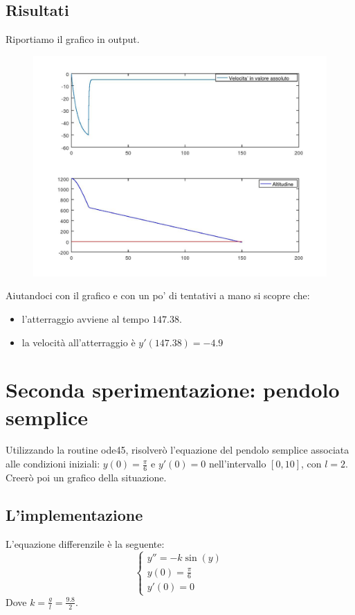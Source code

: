 \documentclass{article}
\begin{document}
	\subsection{Risultati}
	Riportiamo il grafico in output.\\
	\begin{figure}[htp!]
		\centering 
		\includegraphics[width=\textwidth]{5_1.jpeg}
	\end{figure}
	\newpage
	Aiutandoci con il grafico e con un po' di tentativi a mano si scopre che:\\
	\begin{itemize}
		\item l'atterraggio avviene al tempo $147.38$.
		\item la velocità all'atterraggio è $y'(147.38)=-4.9$
	\end{itemize}

	\section{Seconda sperimentazione: pendolo semplice}
	Utilizzando la routine ode45, risolverò l’equazione del pendolo semplice associata alle	condizioni iniziali: $y(0)=\frac{\pi}{6}$ e $y'(0)=0$ nell’intervallo $\left[0, 10\right]$, con $l=2$.\\
	Creerò poi un grafico della situazione.\\
	\subsection{L'implementazione}
	L'equazione differenzile è la seguente:
	\begin{equation}
	\begin{cases}
	y''=-k \sin(y) \\
	y(0)=\frac{\pi}{6}\\
	y'(0)=0
	\end{cases}
	\end{equation}
	Dove $k=\frac{g}{l}=\frac{9.8}{2}$.
	
\end{document}
